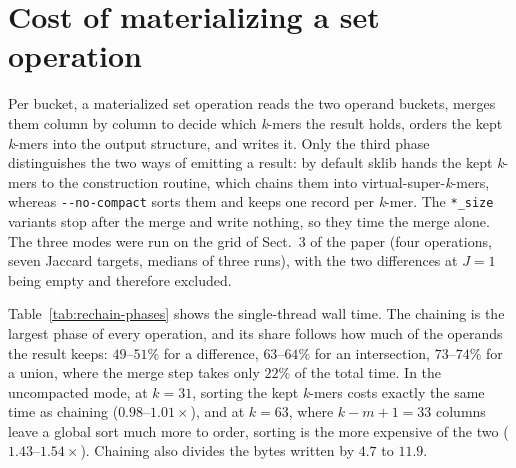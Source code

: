 \documentclass[runningheads,a4paper]{llncs}
\newcommand{\kmer}{\emph{k}-mer\xspace}
\newcommand{\kmers}{\emph{k}-mers\xspace}
\newcommand{\vskmers}{virtual-super-\emph{k}-mers\xspace}
\newcommand{\sklib}{\textsf{sklib}\xspace}
\newif\ifrevmarkup\revmarkupfalse
\newenvironment{revblock}{\ifrevmarkup\color{blue}\fi}{}
\begin{document}
\begin{revblock}
\section{Cost of materializing a set operation}
\label{app:rechain}
Per bucket, a materialized set operation reads the two operand buckets, merges them column by column to decide which \kmers the result holds, orders the kept \kmers into the output structure, and writes it. Only the third phase distinguishes the two ways of emitting a result: by default \sklib{} hands the kept \kmers to the construction routine, which chains them into \vskmers, whereas \texttt{-{}-no-compact} sorts them and keeps one record per \kmer. The \texttt{*\_size} variants stop after the merge and write nothing, so they time the merge alone. The three modes were run on the grid of Sect.~3 of the paper (four operations, seven Jaccard targets, medians of three runs), with the two differences at $J=1$ being empty and therefore excluded.

Table~\ref{tab:rechain-phases} shows the single-thread wall time. The chaining is the largest phase of every operation, and its share follows how much of the operands the result keeps: $49$--$51\%$ for a difference, $63$--$64\%$ for an intersection, $73$--$74\%$ for a union, where the merge step takes only $22\%$ of the total time. In the uncompacted mode, at $k=31$, sorting the kept \kmers costs exactly the same time as chaining ($0.98$--$1.01\times$), and at $k=63$, where $k-m+1=33$ columns leave a global sort much more to order, sorting is the more expensive of the two ($1.43$--$1.54\times$). Chaining also divides the bytes written by $4.7$ to $11.9$.


\end{revblock}
\end{document}
